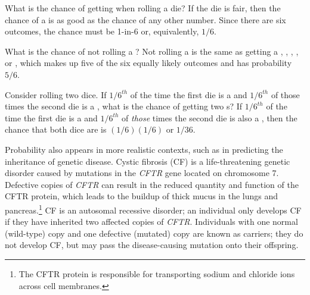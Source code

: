 \begin{example}{What is the chance of getting  when rolling a die?}\label{probOf1}
If the die is fair, then the chance of a  is as good as the chance of any other number. Since there are six outcomes, the chance must be 1-in-6 or, equivalently, $1/6$.
\end{example}

\begin{example}{What is the chance of not rolling a ?}\label{probNot2}
Not rolling a  is the same as getting a , , , , or , which makes up five of the six equally likely outcomes and has probability $5/6$.
\end{example}

\begin{example} {Consider rolling two dice. If $1/6^{th}$ of the time the first die is a  and $1/6^{th}$ of those times the second die is a , what is the chance of getting two s?}\label{probOf2Ones}
If $1/6^{th}$ of the time the first die is a  and $1/6^{th}$ of \emph{those} times the second die is also a , then the chance that both dice are  is $(1/6) (1/6)$ or $1/36$.
\end{example}

Probability also appears in more realistic contexts, such as in predicting the inheritance of genetic disease. Cystic fibrosis (CF) is a life-threatening genetic disorder caused by mutations in the \textit{CFTR} gene located on chromosome 7. Defective copies of \textit{CFTR} can result in the reduced quantity and function of the CFTR protein, which leads to the buildup of thick mucus in the lungs and pancreas.\footnote{The CFTR protein is responsible for transporting sodium and chloride ions across cell membranes.} CF is an autosomal recessive disorder; an individual only develops CF if they have inherited two affected copies of \textit{CFTR}. Individuals with one normal (wild-type) copy and one defective (mutated) copy are known as carriers; they do not develop CF, but may pass the disease-causing mutation onto their offspring.


